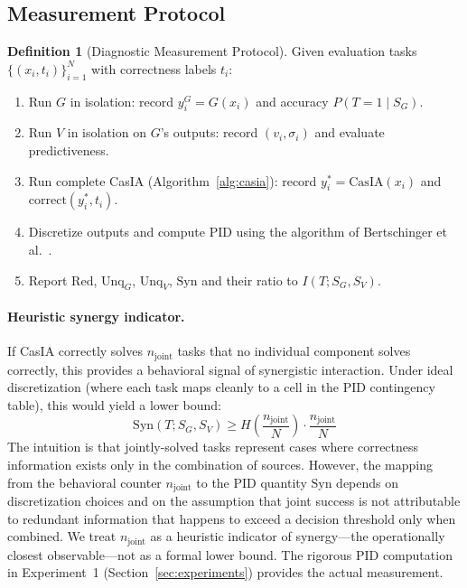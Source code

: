 \documentclass[11pt,a4paper]{article}
\theoremstyle{definition}
\newtheorem{definition}{Definition}[section]
\begin{document}
\subsection{Measurement Protocol}

\begin{definition}[Diagnostic Measurement Protocol]
\label{def:measprotocol}
Given evaluation tasks $\{(x_i, t_i)\}_{i=1}^N$ with correctness labels $t_i$:
\begin{enumerate}[leftmargin=*,itemsep=2pt]
\item Run $G$ in isolation: record $y_i^G = G(x_i)$ and accuracy $P(T=1 \mid S_G)$.
\item Run $V$ in isolation on $G$'s outputs: record $(v_i, \sigma_i)$ and evaluate predictiveness.
\item Run complete CasIA (Algorithm~\ref{alg:casia}): record $y_i^* = \text{CasIA}(x_i)$ and $\text{correct}(y_i^*, t_i)$.
\item Discretize outputs and compute PID using the algorithm of Bertschinger et al.~\cite{bertschinger2014pid}.
\item Report $\mathrm{Red}$, $\mathrm{Unq}_G$, $\mathrm{Unq}_V$, $\mathrm{Syn}$ and their ratio to $I(T; S_G, S_V)$.
\end{enumerate}
\end{definition}

\paragraph{Heuristic synergy indicator.}
\label{heur:synlb}
If CasIA correctly solves $n_\text{joint}$ tasks that no individual component solves correctly, this provides a behavioral signal of synergistic interaction. Under ideal discretization (where each task maps cleanly to a cell in the PID contingency table), this would yield a lower bound:
\begin{equation}
\mathrm{Syn}(T; S_G, S_V) \geq H\!\left(\frac{n_\text{joint}}{N}\right) \cdot \frac{n_\text{joint}}{N}
\end{equation}
The intuition is that jointly-solved tasks represent cases where correctness information exists only in the combination of sources. However, the mapping from the behavioral counter $n_\text{joint}$ to the PID quantity $\mathrm{Syn}$ depends on discretization choices and on the assumption that joint success is not attributable to redundant information that happens to exceed a decision threshold only when combined. We treat $n_\text{joint}$ as a heuristic indicator of synergy---the operationally closest observable---not as a formal lower bound. The rigorous PID computation in Experiment~1 (Section~\ref{sec:experiments}) provides the actual measurement.
\end{document}
